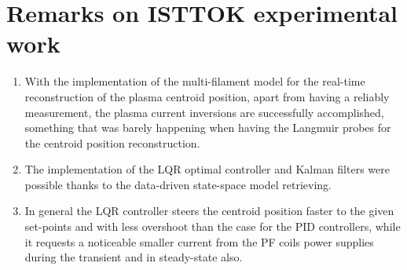 \section{Remarks on ISTTOK experimental work}
\begin{enumerate}
	\item With the implementation of the multi-filament model for the real-time reconstruction of the plasma centroid position, apart from  having a reliably measurement, the plasma current inversions are successfully accomplished, something that was barely happening when having the Langmuir probes for the centroid position reconstruction.\smallskip
	
	\item The implementation of the LQR optimal controller and Kalman filters were possible thanks to the data-driven state-space model retrieving.\smallskip
	
	\item In general the LQR controller steers the centroid position faster to the given set-points and with less overshoot than the case for the PID controllers, while it requests a noticeable smaller current from the PF coils power supplies during the transient and in steady-state also.
	
\end{enumerate}


